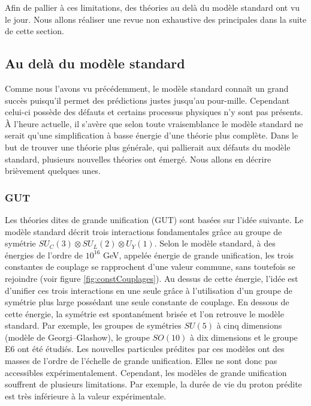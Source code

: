   Afin de pallier \`a ces limitations, des th\'eories au delà du mod\`ele standard ont vu le jour. Nous allons r\'ealiser une revue non exhaustive des principales dans la suite de cette section.
  
  \subsection{Au delà du mod\`ele standard}
  
   Comme nous l'avons vu pr\'ec\'edemment, le mod\`ele standard connaît un grand succ\`es puisqu'il permet des pr\'edictions justes jusqu'au pour-mille. Cependant celui-ci poss\`ede des d\'efauts et certains processus physiques n'y sont pas pr\'esents. \`A l'heure actuelle, il s'av\`ere que selon toute vraisemblance le mod\`ele standard ne serait qu'une simplification \`a basse \'energie d'une th\'eorie plus compl\`ete. Dans le but de trouver une th\'eorie plus g\'en\'erale, qui pallierait aux d\'efauts du mod\`ele standard, plusieurs nouvelles th\'eories ont \'emerg\'e. Nous allons en d\'ecrire bri\`evement quelques unes.
   
   \medskip
   
   \subsubsection{GUT}
   
   Les th\'eories dites de grande unification (GUT) sont bas\'ees sur l'id\'ee suivante. Le mod\`ele standard d\'ecrit trois interactions fondamentales grâce au groupe de sym\'etrie $SU_C(3) \otimes SU_L(2) \otimes U_Y(1)$. Selon le mod\`ele standard, \`a des \'energies de l'ordre de $10^{16}$ GeV, appel\'ee \'energie de grande unification, les trois constantes de couplage se rapprochent d'une valeur commune, sans toutefois se rejoindre (voir figure \ref{fig:constCouplages}). Au dessus de cette \'energie, l'id\'ee est d'unifier ces trois interactions en une seule grâce \`a l'utilisation d'un groupe de sym\'etrie plus large poss\'edant une seule constante de couplage. En dessous de cette \'energie, la sym\'etrie est spontan\'ement bris\'ee et l'on retrouve le mod\`ele standard. Par exemple, les groupes de sym\'etries $SU(5)$ \`a cinq dimensions (mod\`ele de Georgi–Glashow), le groupe $SO(10)$ \`a dix dimensions et le groupe E6 ont \'et\'e \'etudi\'es. Les nouvelles particules pr\'edites par ces mod\`eles ont des masses de l'ordre de l'\'echelle de grande unification. Elles ne sont donc pas accessibles exp\'erimentalement. Cependant, les mod\`eles de grande unification souffrent de plusieurs limitations. Par exemple, la dur\'ee de vie du proton pr\'edite est tr\`es inf\'erieure \`a la valeur exp\'erimentale. 
   

